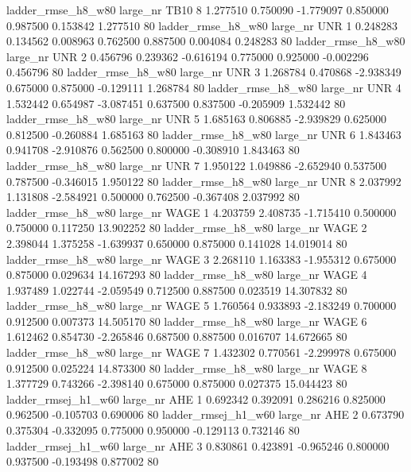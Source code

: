  ladder_rmse_h8_w80   large_nr     TB10                 8  1.277510  0.750090  -1.779097 0.850000 0.987500  0.153842    1.277510 80
 ladder_rmse_h8_w80   large_nr      UNR                 1  0.248283  0.134562   0.008963 0.762500 0.887500  0.004084    0.248283 80
 ladder_rmse_h8_w80   large_nr      UNR                 2  0.456796  0.239362  -0.616194 0.775000 0.925000 -0.002296    0.456796 80
 ladder_rmse_h8_w80   large_nr      UNR                 3  1.268784  0.470868  -2.938349 0.675000 0.875000 -0.129111    1.268784 80
 ladder_rmse_h8_w80   large_nr      UNR                 4  1.532442  0.654987  -3.087451 0.637500 0.837500 -0.205909    1.532442 80
 ladder_rmse_h8_w80   large_nr      UNR                 5  1.685163  0.806885  -2.939829 0.625000 0.812500 -0.260884    1.685163 80
 ladder_rmse_h8_w80   large_nr      UNR                 6  1.843463  0.941708  -2.910876 0.562500 0.800000 -0.308910    1.843463 80
 ladder_rmse_h8_w80   large_nr      UNR                 7  1.950122  1.049886  -2.652940 0.537500 0.787500 -0.346015    1.950122 80
 ladder_rmse_h8_w80   large_nr      UNR                 8  2.037992  1.131808  -2.584921 0.500000 0.762500 -0.367408    2.037992 80
 ladder_rmse_h8_w80   large_nr     WAGE                 1  4.203759  2.408735  -1.715410 0.500000 0.750000  0.117250   13.902252 80
 ladder_rmse_h8_w80   large_nr     WAGE                 2  2.398044  1.375258  -1.639937 0.650000 0.875000  0.141028   14.019014 80
 ladder_rmse_h8_w80   large_nr     WAGE                 3  2.268110  1.163383  -1.955312 0.675000 0.875000  0.029634   14.167293 80
 ladder_rmse_h8_w80   large_nr     WAGE                 4  1.937489  1.022744  -2.059549 0.712500 0.887500  0.023519   14.307832 80
 ladder_rmse_h8_w80   large_nr     WAGE                 5  1.760564  0.933893  -2.183249 0.700000 0.912500  0.007373   14.505170 80
 ladder_rmse_h8_w80   large_nr     WAGE                 6  1.612462  0.854730  -2.265846 0.687500 0.887500  0.016707   14.672665 80
 ladder_rmse_h8_w80   large_nr     WAGE                 7  1.432302  0.770561  -2.299978 0.675000 0.912500  0.025224   14.873300 80
 ladder_rmse_h8_w80   large_nr     WAGE                 8  1.377729  0.743266  -2.398140 0.675000 0.875000  0.027375   15.044423 80
ladder_rmsej_h1_w60   large_nr      AHE                 1  0.692342  0.392091   0.286216 0.825000 0.962500 -0.105703    0.690006 80
ladder_rmsej_h1_w60   large_nr      AHE                 2  0.673790  0.375304  -0.332095 0.775000 0.950000 -0.129113    0.732146 80
ladder_rmsej_h1_w60   large_nr      AHE                 3  0.830861  0.423891  -0.965246 0.800000 0.937500 -0.193498    0.877002 80
